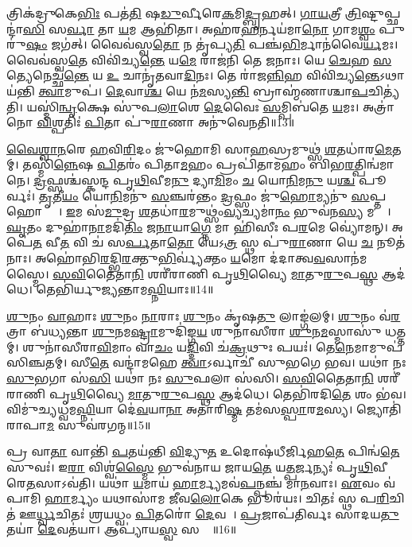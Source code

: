 𑌤𑍍𑌰𑌿𑌕॑𑌦𑍍𑌰𑍁𑌕𑍇\ul{𑌭𑌿𑌃} 𑌪𑌤॑\ul{𑌤𑌿} 𑌷\ul{𑌡𑍁}𑌰𑍍𑌵𑍀𑌰𑍇\ul{𑌕}𑌮𑌿\ul{𑌦𑍍𑌬𑍃}𑌹𑌤𑍍। 
\ul{𑌗𑌾}\ul{𑌯}𑌤𑍍𑌰𑍀 \ul{𑌤𑍍𑌰𑌿}𑌷𑍍𑌟𑍁𑌪𑍍𑌛𑌨𑍍𑌦𑌾॑\ul{𑌸𑌿} 𑌸\ul{𑌰𑍍𑌵𑌾} 𑌤𑌾 \ul{𑌯}𑌮 𑌆𑌹𑌿॑𑌤𑌾। 
𑌅𑌹॑𑌰\ul{𑌹}𑌰𑍍𑌨𑌯॑𑌮𑌾\ul{𑌨𑍋} 𑌗𑌾𑌮\ul{𑌶𑍍𑌵𑌂} 𑌪𑍁𑌰𑍁॑\ul{𑌷𑌂} 𑌜𑌗॑𑌤𑍍। 
𑌵𑍈𑌵॑𑌸𑍍𑌵\ul{𑌤𑍋} 𑌨 𑌤𑍃॑𑌪𑍍𑌯\ul{𑌤𑌿} 𑌪𑌞𑍍𑌚॑\ul{𑌭𑌿}𑌰𑍍𑌮𑌾𑌨॑𑌵𑍈\ul{𑌰𑍍𑌯}𑌮𑌃। 
𑌵𑍈𑌵॑𑌸𑍍𑌵\ul{𑌤𑍇} 𑌵𑌿𑌵𑌿॑𑌚𑍍𑌯\ul{𑌨𑍍𑌤𑍇} 𑌯\ul{𑌮𑍇} 𑌰𑌾𑌜॑𑌨𑌿 𑌤𑍇 \ul{𑌜}𑌨𑌾𑌃। 
𑌯𑍇 \ul{𑌚𑍇}𑌹 \ul{𑌸}𑌤𑍍𑌯𑍇𑌨𑍇𑌚𑍍𑌛॑\ul{𑌨𑍍𑌤𑍇} 𑌯 \ul{𑌉} 𑌚𑌾𑌨𑍃॑𑌤𑌵𑌾\ul{𑌦𑌿}𑌨𑌃। 
𑌤𑍇 𑌰𑌾॑𑌜\ul{𑌨𑍍𑌨𑌿}𑌹 𑌵𑌿𑌵𑌿॑𑌚𑍍𑌯\ul{𑌨𑍍𑌤𑍇}𑌽𑌥𑌾 𑌯॑𑌨𑍍𑌤𑌿 \ul{𑌤𑍍𑌵𑌾}𑌮𑍁𑌪॑। 
\ul{𑌦𑍇}𑌵𑌾\ul{𑌶𑍍𑌚} 𑌯𑍇 𑌨॑\ul{𑌮}𑌸𑍍𑌯\ul{𑌨𑍍𑌤𑌿} 𑌬𑍍𑌰𑌾𑌹𑍍𑌮॑𑌣𑌾𑌶𑍍𑌚𑌾\ul{𑌪}𑌚𑌿𑌤𑍍𑌯॑𑌤𑌿। 
𑌯𑌸𑍍𑌮𑌿॑\ul{𑌨𑍍𑌵𑍃}𑌕𑍍𑌷𑍇 𑌸𑍁॑𑌪\ul{𑌲𑌾}𑌶𑍇 \ul{𑌦𑍇}𑌵𑍈𑌃 \ul{𑌸}𑌮𑍍𑌪𑌿𑌬॑𑌤𑍇 \ul{𑌯}𑌮𑌃। 
𑌅𑌤𑍍𑌰𑌾॑ 𑌨𑍋 \ul{𑌵𑌿}𑌶𑍍𑌪𑌤𑌿𑌃॑ \ul{𑌪𑌿}𑌤𑌾 𑌪𑍁॑\ul{𑌰𑌾}𑌣𑌾 𑌅𑌨𑍁॑𑌵𑍇𑌨𑌤𑌿॥13॥
\anuvakamend[\ul{𑌪}\ul{𑌥𑌿}𑌕𑍃𑌦𑍍𑌭𑍍𑌯𑍋॑ 𑌵𑌿𑌜𑌾\ul{𑌨}𑌤𑍇𑌽𑌨𑍁॑ 𑌵𑍇𑌨𑌤𑌿]

\ul{𑌵𑍈}\ul{𑌶𑍍𑌵𑌾}\ul{𑌨}𑌰𑍇 \ul{𑌹}𑌵𑌿\ul{𑌰𑌿}𑌦𑌂 𑌜𑍁॑𑌹𑍋𑌮𑌿 𑌸𑌾\ul{𑌹}𑌸𑍍𑌰𑌮𑍁𑌥𑍍𑌸॑ \ul{𑌶}𑌤𑌧𑌾॑𑌰\ul{𑌮𑍇}𑌤𑌮𑍍। 
𑌤𑌸𑍍𑌮𑌿॑\ul{𑌨𑍍𑌨𑍇}𑌷 \ul{𑌪𑌿}𑌤𑌰𑌂॑ 𑌪𑌿𑌤𑌾\ul{𑌮}𑌹𑌂 𑌪𑍍𑌰𑌪𑌿॑𑌤𑌾𑌮𑌹𑌂 𑌬𑌿𑌭\ul{𑌰}𑌤𑍍𑌪𑌿𑌨𑍍𑌵॑𑌮𑌾𑌨𑍇। 
\ul{𑌦𑍍𑌰}𑌫𑍍𑌸𑌶𑍍𑌚॑𑌸𑍍𑌕𑌨𑍍𑌦 𑌪𑍃\ul{𑌥𑌿}𑌵𑍀𑌮\ul{𑌨𑍁} 𑌦𑍍𑌯𑌾\ul{𑌮𑌿}𑌮𑌂 \ul{𑌚} 𑌯𑍋\ul{𑌨𑌿}𑌮\ul{𑌨𑍁} 𑌯\ul{𑌶𑍍𑌚} 𑌪𑍂𑌰𑍍𑌵𑌃॑। 
\ul{𑌤𑍃}𑌤𑍀\ul{𑌯𑌂} 𑌯𑍋\ul{𑌨𑌿}𑌮𑌨𑍁॑ \ul{𑌸}𑌞𑍍𑌚𑌰॑𑌨𑍍𑌤𑌂 \ul{𑌦𑍍𑌰}𑌫𑍍𑌸𑌂 𑌜𑍁॑\ul{𑌹𑍋}𑌮𑍍𑌯𑌨𑍁॑ \ul{𑌸}𑌪𑍍𑌤 𑌹𑍋𑌤𑍍𑌰𑌾𑌃᳚। 
\ul{𑌇}𑌮 𑌸॑\ul{𑌮𑍁}𑌦𑍍𑌰 \ul{𑌶}𑌤𑌧𑌾॑\ul{𑌰}𑌮𑍁𑌥𑍍𑌸𑌂॑\ul{𑌵𑍍𑌯}𑌚𑍍𑌯𑌮𑌾॑\ul{𑌨𑌂} 𑌭𑍁𑌵॑𑌨\ul{𑌸𑍍𑌯} 𑌮𑌧𑍍𑌯𑍇᳚। 
\ul{𑌘𑍃}𑌤𑌂 𑌦𑍁𑌹𑌾॑\ul{𑌨𑌾}𑌮𑌦𑌿॑\ul{𑌤𑌿𑌂} 𑌜\ul{𑌨𑌾}𑌯𑌾\ul{𑌗𑍍𑌨𑍇} 𑌮𑌾 𑌹𑌿॑𑌸𑍀𑌃 𑌪\ul{𑌰}𑌮𑍇 𑌵𑍍𑌯𑍋॑𑌮𑌨𑍍। 
𑌅𑌪𑍇॑\ul{𑌤} 𑌵𑍀\ul{𑌤} 𑌵𑌿 𑌚॑ 𑌸\ul{𑌰𑍍𑌪}𑌤𑌾\ul{𑌤𑍋} 𑌯𑍇𑌽\ul{𑌤𑍍𑌰} 𑌸𑍍𑌥 𑌪𑍁॑\ul{𑌰𑌾}𑌣𑌾 𑌯𑍇 \ul{𑌚} 𑌨𑍂𑌤॑𑌨𑌾𑌃। 
𑌅𑌹𑍋॑𑌭𑌿\ul{𑌰}𑌦𑍍𑌭𑌿\ul{𑌰}𑌕𑍍𑌤𑍁\ul{𑌭𑌿}𑌰𑍍𑌵𑍍𑌯॑𑌕𑍍𑌤𑌂 \ul{𑌯}𑌮𑍋 𑌦॑𑌦𑌾𑌤𑍍𑌵\ul{𑌵}𑌸𑌾𑌨॑𑌮𑌸𑍍𑌮𑍈। 
\ul{𑌸}\ul{𑌵𑌿}𑌤𑍈𑌤𑌾\ul{𑌨𑌿} 𑌶𑌰𑍀॑𑌰𑌾𑌣𑌿 𑌪𑍃\ul{𑌥𑌿}𑌵𑍍𑌯𑍈 \ul{𑌮𑌾}𑌤𑍁\ul{𑌰𑍁}𑌪\ul{𑌸𑍍𑌥} 𑌆𑌦॑𑌧𑍇। 
𑌤𑍇𑌭𑌿॑𑌰𑍍𑌯𑍁𑌜𑍍𑌯𑌨𑍍𑌤𑌾𑌮\ul{𑌘𑍍𑌨𑌿}𑌯𑌾𑌃॥14॥

\ul{𑌶𑍁}𑌨𑌂 \ul{𑌵𑌾}𑌹𑌾𑌃  \ul{𑌶𑍁}𑌨𑌂 \ul{𑌨𑌾}𑌰𑌾𑌃  \ul{𑌶𑍁}𑌨𑌂 𑌕𑍃॑𑌷\ul{𑌤𑍁} 𑌲𑌾𑌙𑍍𑌗॑𑌲𑌮𑍍। 
\ul{𑌶𑍁}𑌨𑌂 𑌵॑\ul{𑌰}𑌤𑍍𑌰𑌾 𑌬॑𑌧𑍍𑌯𑌨𑍍𑌤𑌾 \ul{𑌶𑍁}𑌨𑌮\ul{𑌷𑍍𑌟𑍍𑌰𑌾}𑌮𑍁𑌦𑌿॑𑌙𑍍𑌗\ul{𑌯} 𑌶𑍁𑌨𑌾॑𑌸𑍀𑌰𑌾 \ul{𑌶𑍁}𑌨\ul{𑌮}𑌸𑍍𑌮𑌾𑌸𑍁॑ 𑌧𑌤𑍍𑌤𑌮𑍍। 
𑌶𑍁𑌨𑌾॑𑌸𑍀𑌰𑌾\ul{𑌵𑌿}𑌮𑌾𑌂 𑌵𑌾\ul{𑌚𑌂} 𑌯\ul{𑌦𑍍𑌦𑌿}𑌵𑌿 𑌚॑\ul{𑌕𑍍𑌰}𑌥𑍁𑌃 𑌪𑌯𑌃॑। 
𑌤𑍇\ul{𑌨𑍇}𑌮𑌾𑌮𑍁𑌪॑ 𑌸𑌿𑌞𑍍𑌚𑌤𑌮𑍍। 
𑌸𑍀\ul{𑌤𑍇} 𑌵𑌨𑍍𑌦𑌾॑𑌮𑌹𑍇 \ul{𑌤𑍍𑌵𑌾}𑌽𑌰𑍍𑌵𑌾𑌚𑍀॑ 𑌸𑍁𑌭𑌗𑍇 𑌭𑌵। 
𑌯𑌥𑌾॑ 𑌨𑌃 \ul{𑌸𑍁}𑌭𑌗𑌾 𑌸॑\ul{𑌸𑌿} 𑌯𑌥𑌾॑ 𑌨𑌃 \ul{𑌸𑍁}𑌫𑌲𑌾 𑌸॑𑌸𑌿। 
\ul{𑌸}\ul{𑌵𑌿}𑌤𑍈𑌤𑌾\ul{𑌨𑌿} 𑌶𑌰𑍀॑𑌰𑌾𑌣𑌿 𑌪𑍃\ul{𑌥𑌿}𑌵𑍍𑌯𑍈 \ul{𑌮𑌾}𑌤𑍁\ul{𑌰𑍁}𑌪\ul{𑌸𑍍𑌥} 𑌆𑌦॑𑌧𑍇। 
𑌤𑍇𑌭𑌿॑𑌰𑌦𑌿\ul{𑌤𑍇} 𑌶𑌂 𑌭॑𑌵। 
𑌵𑌿𑌮𑍁॑𑌚𑍍𑌯𑌧𑍍𑌵𑌮\ul{𑌘𑍍𑌨𑌿}𑌯𑌾 𑌦𑍇॑\ul{𑌵}𑌯𑌾\ul{𑌨𑌾} 𑌅𑌤𑌾॑𑌰𑌿\ul{𑌷𑍍𑌮} 𑌤𑌮॑𑌸\ul{𑌸𑍍𑌪𑌾}𑌰\ul{𑌮}𑌸𑍍𑌯। 
𑌜𑍍𑌯𑍋𑌤𑌿॑𑌰𑌾𑌪𑌾\ul{𑌮} 𑌸𑍁𑌵॑𑌰𑌗𑌨𑍍𑌮॥15॥

𑌪𑍍𑌰 𑌵𑌾\ul{𑌤𑌾} 𑌵𑌾𑌨𑍍𑌤𑌿॑ \ul{𑌪}𑌤𑌯॑𑌨𑍍𑌤𑌿 \ul{𑌵𑌿}𑌦𑍍𑌯𑍁\ul{𑌤} 𑌉𑌦𑍋𑌷॑𑌧𑍀𑌰𑍍𑌜𑌿𑌹\ul{𑌤𑍇} 𑌪𑌿𑌨𑍍𑌵॑\ul{𑌤𑍇} 𑌸𑍁𑌵𑌃॑। 
𑌇\ul{𑌰𑌾} 𑌵𑌿𑌶𑍍𑌵॑\ul{𑌸𑍍𑌮𑍈} 𑌭𑍁𑌵॑𑌨𑌾𑌯 𑌜𑌾𑌯\ul{𑌤𑍇} 𑌯\ul{𑌤𑍍𑌪}𑌰𑍍𑌜𑌨𑍍𑌯𑌃॑ 𑌪𑍃\ul{𑌥𑌿}𑌵𑍀 𑌰𑍇\ul{𑌤}𑌸𑌾𑌽𑌵॑𑌤𑌿। 
𑌯𑌥𑌾॑ \ul{𑌯}𑌮𑌾𑌯॑ \ul{𑌹𑌾}𑌰𑍍𑌮𑍍𑌯𑌮𑌵॑\ul{𑌪}𑌨𑍍𑌪𑌞𑍍𑌚॑ 𑌮𑌾\ul{𑌨}𑌵𑌾𑌃। 
\ul{𑌏}𑌵𑌂 𑌵॑𑌪𑌾𑌮𑌿 \ul{𑌹𑌾}𑌰𑍍𑌮𑍍𑌯𑌂 𑌯𑌥𑌾𑌸𑌾॑𑌮 𑌜𑍀𑌵\ul{𑌲𑍋}𑌕𑍇 𑌭𑍂𑌰॑𑌯𑌃। 
𑌚𑌿𑌤𑌃॑ 𑌸𑍍𑌥 𑌪\ul{𑌰𑌿}𑌚𑌿𑌤॑ 𑌊\ul{𑌰𑍍𑌧𑍍𑌵}𑌚𑌿𑌤𑌃॑  𑌶𑍍𑌰𑌯𑌧𑍍𑌵𑌂 \ul{𑌪𑌿}𑌤𑌰𑍋॑ \ul{𑌦𑍇}𑌵𑌤𑌾᳚। 
\ul{𑌪𑍍𑌰}𑌜𑌾𑌪॑𑌤𑌿𑌰𑍍𑌵𑌃 𑌸𑌾𑌦𑌯\ul{𑌤𑍁} 𑌤𑌯𑌾॑ \ul{𑌦𑍇}𑌵𑌤॑𑌯𑌾। 
𑌆𑌪𑍍𑌯𑌾॑𑌯\ul{𑌸𑍍𑌵} 𑌸𑌨𑍍𑌤𑍇᳚॥16॥
\anuvakamend[\ul{𑌅}\ul{𑌘𑍍𑌨𑌿}𑌯𑌾 𑌅॑𑌗𑌨𑍍𑌮 \ul{𑌸}𑌪𑍍𑌤 𑌚॑]

